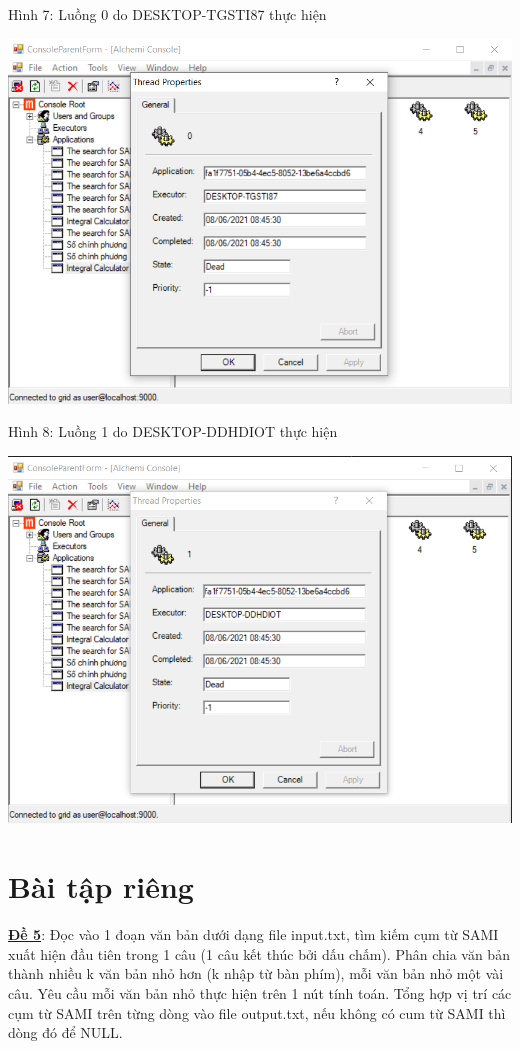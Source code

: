 \documentclass[12pt,a4paper]{article}
\begin{document}
Hình 7: Luồng 0 do DESKTOP-TGSTI87 thực hiện
\begin{center}
\includegraphics[scale=0.86]{3.1.png} \\[0.5cm]
\end{center}



Hình 8: Luồng 1 do DESKTOP-DDHDIOT thực hiện
\begin{center}
\includegraphics[scale=0.88]{3.2.png}
\end{center}



\newpage

\section{Bài tập riêng}
\underline{\textbf{Đề 5}}: Đọc vào 1 đoạn văn bản dưới dạng file input.txt, tìm kiếm cụm từ SAMI xuất hiện đầu tiên trong 1 câu (1 câu kết thúc bởi dấu chấm). Phân chia văn bản thành nhiều k văn bản nhỏ hơn (k nhập từ bàn phím), mỗi văn bản nhỏ một vài câu. Yêu cầu mỗi văn bản nhỏ thực hiện trên 1 nút tính toán. Tổng hợp vị trí các cụm từ SAMI trên từng dòng vào file output.txt, nếu không có cum từ SAMI thì dòng đó để NULL. \\[0.5cm]
\end{document}
